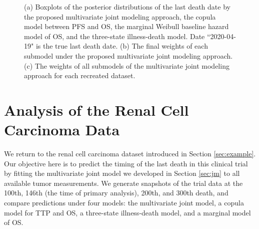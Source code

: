 \begin{figure}
\centering
{}
\hfill
{}
\hfill
{}
\caption{(a) Boxplots of the posterior distributions of the last death date by the proposed multivariate joint modeling approach, the copula model between PFS and OS, the marginal Weibull baseline hazard model of OS, and the three-state illness-death model. Date ``2020-04-19" is the true last death date. (b) The final weights of each submodel under the proposed multivariate joint modeling approach. (c) The weights of all submodels of the multivariate joint modeling approach for each recreated dataset.}
\end{figure}

\section{Analysis of the Renal Cell Carcinoma Data}
\label{sec:caseanalysis}
We return to the renal cell carcinoma dataset introduced in Section \ref{sec:example}. Our objective here is to predict the timing of the last death in this clinical trial by fitting the multivariate joint model we developed in Section \ref{sec:jm} to all available tumor measurements. We generate snapshots of the trial data at the 100th, 146th (the time of primary analysis), 200th, and 300th death, and compare predictions under four models: the multivariate joint model, a copula model for \ac{TTP} and OS, a three-state illness-death model, and a marginal model of OS. 

